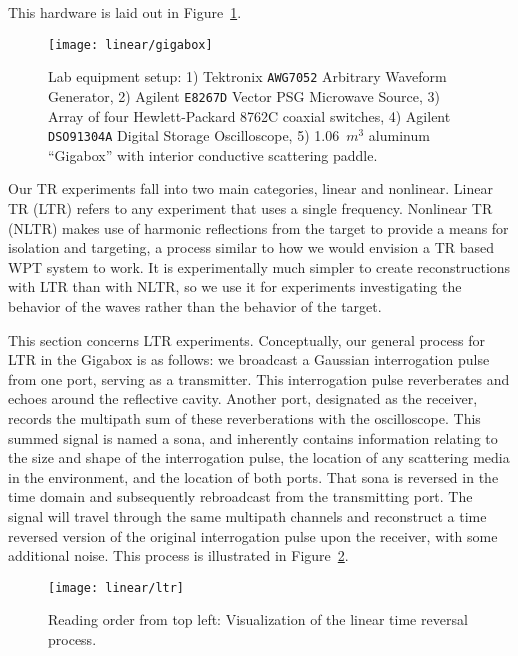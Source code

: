 This hardware is laid out in Figure~\ref{fig:linear-gigabox}.

\begin{figure}[h!]
\centering
\texttt{[image: linear/gigabox]}
    \caption[Lab equipment setup]{Lab equipment setup: 1) Tektronix \texttt{AWG7052} Arbitrary Waveform Generator, 2) Agilent \texttt{E8267D} Vector PSG Microwave Source, 3) Array of four Hewlett-Packard 8762C coaxial switches, 4) Agilent \texttt{DSO91304A} Digital Storage Oscilloscope, 5) 1.06~$m^3$ aluminum ``Gigabox'' with interior conductive scattering paddle.}
    \label{fig:linear-gigabox}
\end{figure}

Our TR experiments fall into two main categories, linear and nonlinear. Linear TR (LTR) refers to any experiment that uses a single frequency. Nonlinear TR (NLTR) makes use of harmonic reflections from the target to provide a means for isolation and targeting, a process similar to how we would envision a TR based WPT system to work.  It is experimentally much simpler to create reconstructions with LTR than with NLTR, so we use it for experiments investigating the behavior of the waves rather than the behavior of the target.

This section concerns LTR experiments. Conceptually, our general process for LTR in the Gigabox is as follows: we broadcast a Gaussian interrogation pulse from one port, serving as a transmitter. This interrogation pulse reverberates and echoes around the reflective cavity. Another port, designated as the receiver, records the multipath sum of these reverberations with the oscilloscope. This summed signal is named a sona, and inherently contains information relating to the size and shape of the interrogation pulse, the location of any scattering media in the environment, and the location of both ports. That sona is reversed in the time domain and subsequently rebroadcast from the transmitting port. The signal will travel through the same multipath channels and reconstruct a time reversed version of the original interrogation pulse upon the receiver, with some additional noise. This process is illustrated in Figure~\ref{fig:linear-ltr}.

\begin{figure}[h!]
\centering
\texttt{[image: linear/ltr]}
    \caption[Conceptual overview of linear time reversal]{Reading order from top left: Visualization of the linear time reversal process.}
    \label{fig:linear-ltr}
\end{figure}

